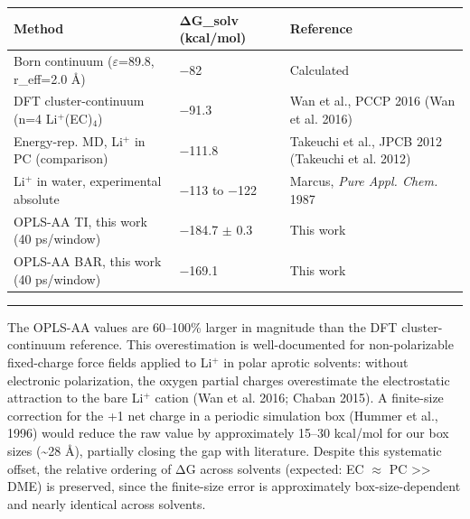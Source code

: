 \documentclass[
  11pt,
]{article}
\newcounter{none} %
\begin{document}
{\def\LTcaptype{none} %
\begin{longtable}[]{@{}
  >{\raggedright\arraybackslash}p{}
  >{\raggedright\arraybackslash}p{}
  >{\raggedright\arraybackslash}p{}@{}}
\toprule\noalign{}
\begin{minipage}[b]{\linewidth}\raggedright
Method
\end{minipage} & \begin{minipage}[b]{\linewidth}\raggedright
ΔG\_solv (kcal/mol)
\end{minipage} & \begin{minipage}[b]{\linewidth}\raggedright
Reference
\end{minipage} \\
\midrule\noalign{}
\endhead
\bottomrule\noalign{}
\endlastfoot
Born continuum (\(\varepsilon\)=89.8, r\_eff=2.0 \AA{}) & −82 &
Calculated \\
DFT cluster-continuum (n=4 Li\(^{+}\)(EC)\(_{4}\)) & −91.3 & Wan et al.,
PCCP 2016 ({Wan et al.} 2016) \\
Energy-rep. MD, Li\(^{+}\) in PC (comparison) & −111.8 & Takeuchi et
al., JPCB 2012 ({Takeuchi et al.} 2012) \\
Li\(^{+}\) in water, experimental absolute & −113 to −122 & Marcus,
\emph{Pure Appl. Chem.} 1987 \\
OPLS-AA TI, this work (40 ps/window) & −184.7 \(\pm\) 0.3 & This work \\
OPLS-AA BAR, this work (40 ps/window) & −169.1 & This work \\
\end{longtable}
}

\begin{center}\rule{0.5\linewidth}{0.5pt}\end{center}

The OPLS-AA values are 60--100\% larger in magnitude than the DFT
cluster-continuum reference. This overestimation is well-documented for
non-polarizable fixed-charge force fields applied to Li\(^{+}\) in polar
aprotic solvents: without electronic polarization, the oxygen partial
charges overestimate the electrostatic attraction to the bare Li\(^{+}\)
cation ({Wan et al.} 2016; Chaban 2015). A finite-size correction for
the +1 net charge in a periodic simulation box (Hummer et al., 1996)
would reduce the raw value by approximately 15--30 kcal/mol for our box
sizes (\textasciitilde28 \AA{}), partially closing the gap with
literature. Despite this systematic offset, the relative ordering of ΔG
across solvents (expected: EC \(\approx\) PC \textgreater\textgreater{}
DME) is preserved, since the finite-size error is approximately
box-size-dependent and nearly identical across solvents.
\end{document}
